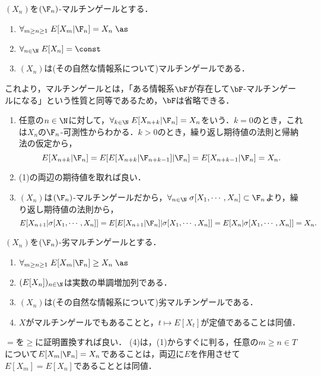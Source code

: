 \documentclass[uplatex,dvipdfmx]{jsreport}
\begin{document}
\begin{lemma}[マルチンゲールの基本性質]
    $(X_n)$を$(\F_n)$-マルチンゲールとする．
    \begin{enumerate}
        \item $\forall_{m\ge n\ge1}\;E[X_m|\F_n]=X_n\;\as$
        \item $\forall_{n\in\N}\;E[X_n]=\const$
        \item $(X_n)$は(その自然な情報系について)マルチンゲールである．
    \end{enumerate}
    これより，マルチンゲールとは，「ある情報系$\bF$が存在して$\bF$-マルチンゲールになる」という性質と同等であるため，$\bF$は省略できる．
\end{lemma}
\begin{Proof}\mbox{}
    \begin{enumerate}
        \item 任意の$n\in\N$に対して，$\forall_{k\in\N}\;E[X_{n+k}|\F_n]=X_n$をいう．$k=0$のとき，これは$X_n$の$\F_n$-可測性からわかる．$k>0$のとき，繰り返し期待値の法則と帰納法の仮定から，
        \[E[X_{n+k}|\F_n]=E[E[X_{n+k}|\F_{n+k-1}]|\F_n]=E[X_{n+k-1}|\F_n]=X_n.\]
        \item (1)の両辺の期待値を取れば良い．
        \item $(X_n)$は$(\F_n)$-マルチンゲールだから，$\forall_{n\in\N}\;\sigma[X_1,\cdots,X_n]\subset\F_n$より，繰り返し期待値の法則から，
        \[E[X_{n+1}|\sigma[X_1,\cdots,X_n]]=E[E[X_{n+1}|\F_n]|\sigma[X_1,\cdots,X_n]]=E[X_n|\sigma[X_1,\cdots,X_n]]=X_n.\]
    \end{enumerate}
\end{Proof}

\begin{lemma}[劣マルチンゲールの基本性質]\label{lemma-property-of-submartingale}
    $(X_n)$を$(\F_n)$-劣マルチンゲールとする．
    \begin{enumerate}
        \item $\forall_{m\ge n\ge1}\;E[X_m|\F_n]\ge X_n\;\as$
        \item $(E[X_n])_{n\in\N}$は実数の単調増加列である．
        \item $(X_n)$は(その自然な情報系について)劣マルチンゲールである．
        \item $X$がマルチンゲールでもあることと，$t\mapsto E[X_t]$が定値であることは同値．
    \end{enumerate}
\end{lemma}
\begin{Proof}
    $=$を$\ge$に証明置換すれば良い．
    (4)は，(1)からすぐに判る，任意の$m\ge n\in T$について$E[X_m|\F_n]=X_n$であることは，両辺に$E$を作用させて$E[X_m]=E[X_n]$であることとは同値．
\end{Proof}
\end{document}
